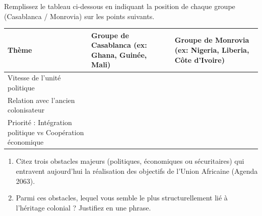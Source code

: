 \documentclass[11pt]{article}
\begin{document}
\begin{exercice}
Remplissez le tableau ci-dessous en indiquant la position de chaque groupe (Casablanca / Monrovia) sur les points suivants.

\begin{tabular}{|p{4.5cm}|p{4.5cm}|p{4.5cm}|}
\hline
\textbf{Thème} & \textbf{Groupe de Casablanca (ex: Ghana, Guinée, Mali)} & \textbf{Groupe de Monrovia (ex: Nigeria, Liberia, Côte d'Ivoire)} \\
\hline
Vitesse de l'unité politique & & \\
\hline
Relation avec l'ancien colonisateur & & \\
\hline
Priorité : Intégration politique vs Coopération économique & & \\
\hline
\end{tabular}
\end{exercice}

\begin{exercice}
\begin{enumerate}
    \item Citez trois obstacles majeurs (politiques, économiques ou sécuritaires) qui entravent aujourd'hui la réalisation des objectifs de l'Union Africaine (Agenda 2063).
    \item Parmi ces obstacles, lequel vous semble le plus structurellement lié à l'héritage colonial ? Justifiez en une phrase.
\end{enumerate}
\end{exercice}
\end{document}

